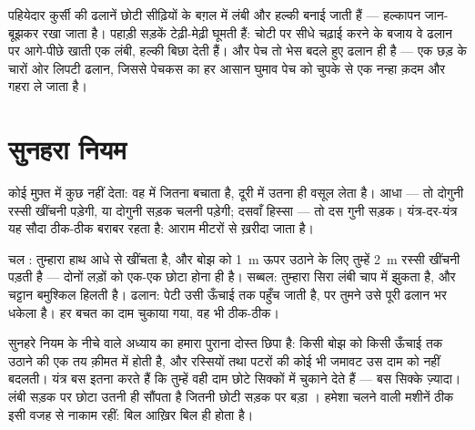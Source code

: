 \begin{example}[इलाक़े में ढलानें]\label{ex:g5:simple-machines:ramps}
पहियेदार कुर्सी की ढलानें छोटी सीढ़ियों के बग़ल में लंबी और हल्की
बनाई जाती हैं --- हल्कापन जान-बूझकर रखा जाता है। पहाड़ी सड़कें
टेढ़ी-मेढ़ी घूमती हैं: चोटी पर सीधे चढ़ाई करने के बजाय वे ढलान पर
आगे-पीछे  खाती एक लंबी, हल्की  बिछा देती हैं। और पेच तो
भेस बदले हुए ढलान ही है --- एक छड़ के चारों ओर लिपटी ढलान, जिससे
पेचकस का हर आसान घुमाव पेच को चुपके से एक नन्हा क़दम और गहरा ले जाता
है।
\end{example}

\section{सुनहरा नियम}

\begin{proposition}[यंत्रों का सुनहरा नियम]\label{prop:g5:simple-machines:golden}
कोई  मुफ़्त में कुछ नहीं देता: वह  में जितना बचाता है,
दूरी में उतना ही वसूल लेता है। आधा  --- तो दोगुनी रस्सी खींचनी
पड़ेगी, या दोगुनी सड़क चलनी पड़ेगी; दसवाँ हिस्सा  --- तो दस गुनी
सड़क। यंत्र-दर-यंत्र यह सौदा ठीक-ठीक बराबर रहता है: आराम मीटरों से
ख़रीदा जाता है।
\end{proposition}

\begin{example}[नियम की जाँच]\label{ex:g5:simple-machines:check}
चल : तुम्हारा हाथ आधे  से खींचता है, और बोझ को \qty{1}{m}
ऊपर उठाने के लिए तुम्हें \qty{2}{m} रस्सी खींचनी पड़ती है --- दोनों
लड़ों को एक-एक  छोटा होना ही है। सब्बल: तुम्हारा सिरा लंबी चाप
में झुकता है, और चट्टान बमुश्किल हिलती है। ढलान: पेटी उसी ऊँचाई तक
पहुँच जाती है, पर तुमने उसे पूरी ढलान भर धकेला है। हर बचत का दाम
चुकाया गया, वह भी ठीक-ठीक।
\end{example}

\begin{remark}\label{rem:g5:simple-machines:whygolden}
सुनहरे नियम के नीचे  वाले अध्याय का हमारा पुराना दोस्त छिपा है:
किसी बोझ को किसी ऊँचाई तक उठाने की एक तय क़ीमत  में होती है, और
रस्सियों तथा पटरों की कोई भी जमावट उस दाम को नहीं बदलती। यंत्र बस
इतना करते हैं कि तुम्हें वही दाम छोटे सिक्कों में चुकाने देते हैं ---
बस सिक्के ज़्यादा। लंबी सड़क पर छोटा  उतनी ही  सौंपता है जितनी
छोटी सड़क पर बड़ा । हमेशा चलने वाली मशीनें ठीक इसी वजह से नाकाम
रहीं: बिल आख़िर बिल ही होता है।
\end{remark}

